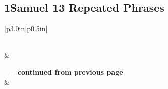 \subsection{1Samuel 13 Repeated Phrases}


\normalsize
 
\begin{center}
\begin{longtable}{|p{3.0in}|p{0.5in}|}
\caption[1Samuel 13 Repeated Phrases]{1Samuel 13 Repeated Phrases}\label{table:Repeated Phrases 1Samuel 13} \\
\hline {} &  \\ \hline 
\endfirsthead
 
{{\bfseries \tablename\ \thetable{} -- continued from previous page}} \\  
\hline {} &  \\ \hline 
\endhead
 

\end{longtable}
\end{center}
